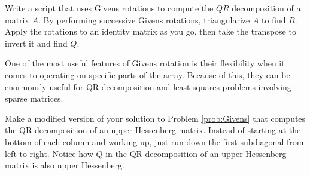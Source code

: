 \begin{problem}
\label{prob:Givens}
Write a script that uses Givens rotations to compute the $QR$ decomposition of a matrix $A$.
By performing successive Givens rotations, triangularize $A$ to find $R$.
Apply the rotations to an identity matrix as you go, then take the transpose to invert it and find $Q$.
\end{problem}

One of the most useful features of Givens rotation is their flexibility when it comes to operating on specific parts of the array.
Because of this, they can be enormously useful for QR decomposition and least squares problems involving sparse matrices.

\begin{problem}
Make a modified version of your solution to Problem \ref{prob:Givens} that computes the QR decomposition of an upper Hessenberg matrix.
Instead of starting at the bottom of each column and working up, just run down the first subdiagonal from left to right.
Notice how $Q$ in the QR decomposition of an upper Hessenberg matrix is also upper Hessenberg.
\end{problem}
